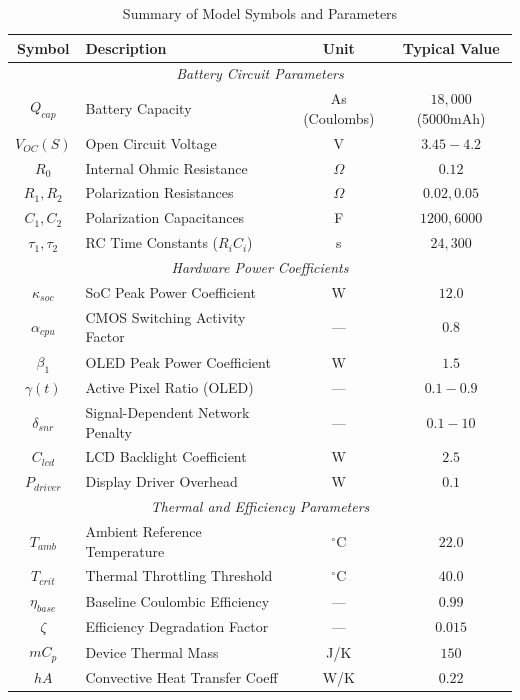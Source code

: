 \documentclass[12pt]{article}
\begin{document}
\begin{table}[H]
\centering
\caption{Summary of Model Symbols and Parameters}
\label{tab:vars}
\begin{tabular}{|c|l|c|c|}
\hline
\textbf{Symbol} & \textbf{Description} & \textbf{Unit} & \textbf{Typical Value} \\
\hline
\multicolumn{4}{|c|}{\textit{Battery Circuit Parameters}} \\
\hline
$Q_{cap}$ & Battery Capacity & As (Coulombs) & $18,000$ (5000mAh) \\
$V_{OC}(S)$ & Open Circuit Voltage & V & $3.45 - 4.2$ \\
$R_0$ & Internal Ohmic Resistance & $\Omega$ & $0.12$ \\
$R_1, R_2$ & Polarization Resistances & $\Omega$ & $0.02, 0.05$ \\
$C_1, C_2$ & Polarization Capacitances & F & $1200, 6000$ \\
$\tau_1, \tau_2$ & RC Time Constants ($R_i C_i$) & s & $24, 300$ \\
\hline
\multicolumn{4}{|c|}{\textit{Hardware Power Coefficients}} \\
\hline
$\kappa_{soc}$ & SoC Peak Power Coefficient & W & $12.0$ \\
$\alpha_{cpu}$ & CMOS Switching Activity Factor & --- & $0.8$ \\
$\beta_1$ & OLED Peak Power Coefficient & W & $1.5$ \\
$\gamma(t)$ & Active Pixel Ratio (OLED) & --- & $0.1 - 0.9$ \\
$\delta_{snr}$ & Signal-Dependent Network Penalty & --- & $0.1 - 10$ \\
$C_{lcd}$ & LCD Backlight Coefficient & W & $2.5$ \\
$P_{driver}$ & Display Driver Overhead & W & $0.1$ \\
\hline
\multicolumn{4}{|c|}{\textit{Thermal and Efficiency Parameters}} \\
\hline
$T_{amb}$ & Ambient Reference Temperature & $^\circ$C & $22.0$ \\
$T_{crit}$ & Thermal Throttling Threshold & $^\circ$C & $40.0$ \\
$\eta_{base}$ & Baseline Coulombic Efficiency & --- & $0.99$ \\
$\zeta$ & Efficiency Degradation Factor & --- & $0.015$ \\
$m C_p$ & Device Thermal Mass & J/K & $150$ \\
$hA$ & Convective Heat Transfer Coeff & W/K & $0.22$ \\
\hline
\end{tabular}
\end{table}
\end{document}

